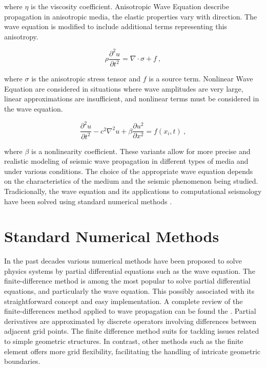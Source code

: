 \documentclass[11pt,twoside]{article}
\begin{document}
where $\eta$ is the viscosity coefficient. Anisotropic Wave Equation describe propagation in anisotropic media, 
the elastic properties vary with direction. The wave equation is modified to include additional terms representing 
this anisotropy.

\begin{equation*}
\rho \frac{\partial^2 u}{\partial t^2} = \nabla \cdot \sigma + f \ ,
\label{anisotropic}
\end{equation*}
    
where $\sigma$ is the anisotropic stress tensor and $f$ is a source term. Nonlinear Wave Equation are considered 
in situations where wave amplitudes are very large, linear approximations are insufficient, and nonlinear terms 
must be considered in the wave equation.

\begin{equation*}
\frac{\partial^2 u}{\partial t^2} - c^2 \nabla^2 u + \beta \frac{\partial u^2}{\partial x^2} = f(x_i, t) \ ,
\label{nonlinear}
\end{equation*}
    
where $\beta$ is a nonlinearity coefficient. These variants allow for more precise and realistic modeling 
of seismic wave propagation in different types of media and under various conditions. The choice of the 
appropriate wave equation depends on the characteristics of the medium and the seismic phenomenon being studied. 
Tradicionally, the wave equation and its applications to computational seismology have been solved using standard 
numerical methods \citep{Igel2017}.

\section{Standard Numerical Methods}\label{sec:standard_numerical_methods}

In the past decades various numerical methods have been proposed to solve physics systems by partial differential 
equations such as the wave equation. The finite-difference method is among the most 
popular to solve partial differential equations, and particularly the wave equation. This possibly associated with 
its straightforward concept and easy implementation. A complete review of the finite-differences method applied to 
wave propagation can be found the . Partial derivatives are approximated by discrete operators 
involving differences between adjacent grid points. The finite difference method suits for tackling issues related to 
simple geometric structures. In contrast, other methods such as the finite element offers more grid flexibility, 
facilitating the handling of intricate geometric boundaries.
\end{document}
